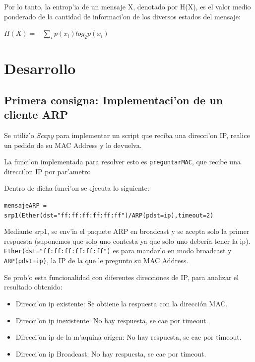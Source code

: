 \documentclass[a4paper,10pt]{article}
\begin{document}
Por lo tanto, la entrop'ia de un mensaje X, denotado por H(X), es el valor medio ponderado de la cantidad de informaci'on de los diversos estados del mensaje:

\vspace*{5 mm}
$H(X) = -\sum_{i} p(x_{i})log_{2}p(x_{i})$
\\

\section{Desarrollo}
\label{desarrollo1:}
\subsection{Primera consigna: Implementaci'on de un cliente ARP}
\label{expli1:}

Se utiliz'o \textit{Scapy} para implementar un script que reciba una direcci'on IP, realice un pedido de su MAC Address y lo devuelva.

La funci'on implementada para resolver esto es \texttt{preguntarMAC}, que recibe una direcci'on IP por par'ametro

Dentro de dicha funci'on se ejecuta lo siguiente:

\vspace*{5 mm}
\texttt{mensajeARP = srp1(Ether(dst="ff:ff:ff:ff:ff:ff")/ARP(pdst=ip),timeout=2)}
\vspace*{5 mm}

Mediante srp1, se env'ia el paquete ARP en broadcast y se acepta solo la primer respuesta (suponemos que solo uno contesta ya que solo uno debería tener la ip). \texttt{Ether(dst="ff:ff:ff:ff:ff:ff")} es para mandarlo en modo broadcast y \texttt{ARP(pdst=ip)}, la IP de la que le pregunto su MAC Address.

\vspace*{5 mm}
Se prob'o esta funcionalidad con diferentes direcciones de IP, para analizar el resultado obtenido:

\begin{itemize}
	\item Direcci'on ip existente: Se obtiene la respuesta con la dirección MAC.
	\item Direcci'on ip inexistente: No hay respuesta, se cae por timeout.
	\item Direcci'on ip de la m'aquina origen: No hay respuesta, se cae por timeout.
	\item Direcci'on ip Broadcast: No hay respuesta, se cae por timeout.
\end{itemize}
\end{document}
